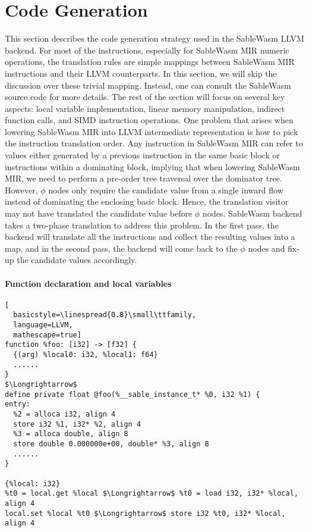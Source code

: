 \section{Code Generation}

This section describes the code generation strategy used in the SableWasm LLVM
backend. For most of the instructions, especially for SableWasm MIR numeric
operations, the translation rules are simple mappings between SableWasm MIR
instructions and their LLVM counterparts. In this section, we will skip the
discussion over these trivial mapping. Instead, one can consult the SableWasm
source code for more details. The rest of the section will focus on several
key aspects: local variable implementation, linear memory manipulation,
indirect function calls, and SIMD instruction operations. One problem that
arises when lowering SableWasm MIR into LLVM intermediate representation is
how to pick the instruction translation order. Any instruction in SableWasm MIR
can refer to values either generated by a previous instruction in the same basic
block or instructions within a dominating block, implying that when lowering
SableWasm MIR, we need to perform a pre-order tree traversal over the dominator
tree. However, $\phi$ nodes only require the candidate value from a single
inward flow instead of dominating the enclosing basic block.
Hence, the translation visitor may not have translated the candidate value
before $\phi$ nodes. SableWasm backend takes a two-phase translation to address
this problem. In the first pass, the backend will translate all the instructions
and collect the resulting values into a map, and in the second pass, the backend
will come back to the $\phi$ nodes and fix-up the candidate values accordingly.

\paragraph{Function declaration and local variables} \quad
\begin{lstlisting}[
  basicstyle=\linespread{0.8}\small\ttfamily, 
  language=LLVM, 
  mathescape=true]
function %foo: [i32] -> [f32] {
  {(arg) %local0: i32, %local1: f64} 
  ......
}
$\Longrightarrow$
define private float @foo(%__sable_instance_t* %0, i32 %1) {
entry:
  %2 = alloca i32, align 4
  store i32 %1, i32* %2, align 4
  %3 = alloca double, align 8
  store double 0.000000e+00, double* %3, align 8
  ......
}

{%local: i32} 
%t0 = local.get %local $\Longrightarrow$ %t0 = load i32, i32* %local, align 4
local.set %local %t0 $\Longrightarrow$ store i32 %t0, i32* %local, align 4
\end{lstlisting}

